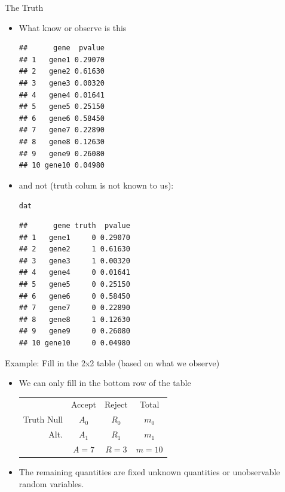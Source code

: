 \documentclass[xcolor=x11names,compress]{beamer}\usepackage[]{graphicx}\usepackage[]{color}
\makeatletter
\newcommand{\hlstd}[1]{\textcolor[rgb]{0.345,0.345,0.345}{#1}}%
\newenvironment{kframe}{%
 \def\at@end@of@kframe{}%
 \ifinner\ifhmode%
  \def\at@end@of@kframe{\end{minipage}}%
  \begin{minipage}{\columnwidth}%
 \fi\fi%
 \def\FrameCommand##1{\hskip\@totalleftmargin \hskip-\fboxsep
 \colorbox{shadecolor}{##1}\hskip-\fboxsep
     \hskip-\linewidth \hskip-\@totalleftmargin \hskip\columnwidth}%
 \MakeFramed {\advance\hsize-\width
   \@totalleftmargin\z@ \linewidth\hsize
   \@setminipage}}%
 {\par\unskip\endMakeFramed%
 \at@end@of@kframe}
\newenvironment{knitrout}{}{} %
\makeatother
\begin{document}
\begin{frame}[fragile]{The Truth}
  \begin{itemize}
  \item What know or observe is this
\begin{knitrout}\tiny
{}\color{fgcolor}\begin{kframe}
\begin{verbatim}
##      gene  pvalue
## 1   gene1 0.29070
## 2   gene2 0.61630
## 3   gene3 0.00320
## 4   gene4 0.01641
## 5   gene5 0.25150
## 6   gene6 0.58450
## 7   gene7 0.22890
## 8   gene8 0.12630
## 9   gene9 0.26080
## 10 gene10 0.04980
\end{verbatim}
\end{kframe}
\end{knitrout}
\item and not (truth colum is not known to us):
\begin{knitrout}\tiny
{}\color{fgcolor}\begin{kframe}
\begin{alltt}
\hlstd{dat}
\end{alltt}
\begin{verbatim}
##      gene truth  pvalue
## 1   gene1     0 0.29070
## 2   gene2     1 0.61630
## 3   gene3     1 0.00320
## 4   gene4     0 0.01641
## 5   gene5     0 0.25150
## 6   gene6     0 0.58450
## 7   gene7     0 0.22890
## 8   gene8     1 0.12630
## 9   gene9     0 0.26080
## 10 gene10     0 0.04980
\end{verbatim}
\end{kframe}
\end{knitrout}
  \end{itemize}
\end{frame}



\begin{frame}{Example: Fill in the 2x2 table (based on what we observe)}
   \begin{itemize}
     \item We can only fill in the bottom row of the table
        \begin{center}
          \begin{tabular}{r|c|c|c}
            & Accept & Reject & Total \\
            \cline{1-4}
            Truth Null  & $A_0$ & $R_0$ & $m_0$ \\
            \cline{1-4}
            Alt. & $A_1$ & $R_1$ & $m_1$ \\
            \cline{1-4} 
            & $A=7$ & $R=3$ & $m=10$
     \end{tabular}
   \end{center}
 \item The remaining quantities are fixed unknown quantities or unobservable random variables.
   \end{itemize}
\end{frame}
\end{document}
